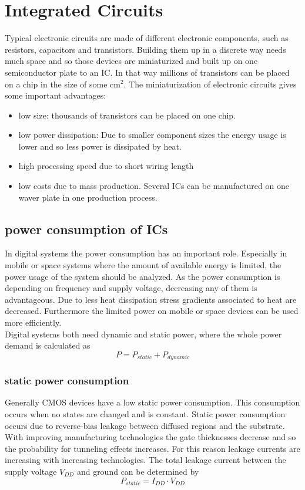 \chapter{Integrated Circuits}
Typical electronic circuits are made of different electronic components, such as resistors, capacitors and transistors. Building them up in a discrete way needs much space and so those devices are miniaturized and built up on one semiconductor plate to an IC. In that way millions of transistors can be placed on a chip in the size of some cm$^2$. The miniaturization of electronic circuits gives some important advantages:
\begin{itemize}
\item low size: thousands of transistors can be placed on one chip.
\item low power dissipation: Due to smaller component sizes the energy usage is lower and so less power is dissipated by heat.
\item high processing speed due to short wiring length
\item low costs due to mass production. Several ICs can be manufactured on one waver plate in one production process.
\end{itemize}
\section{power consumption of ICs}
In digital systems the power consumption has an important role. Especially in mobile or space systems where the amount of available energy is limited, the power usage of the system should be analyzed. As the power consumption is depending on frequency and supply voltage, decreasing any of them is advantageous. Due to less heat dissipation stress gradients associated to heat are decreased. Furthermore the limited power on mobile or space devices can be used more efficiently.\\
Digital systems both need dynamic and static power, where the whole power demand is calculated as
\begin{equation}
P=P_{static}+P_{dynamic}
\end{equation}
\subsection{static power consumption}
Generally CMOS devices have a low static power consumption. This consumption occurs when no states are changed and is constant. Static power consumption occurs due to reverse-bias leakage between diffused regions and the substrate.\cite{Sar97} With improving manufacturing technologies the gate thicknesses decrease and so the probability for tunneling effects increases. For this reason leakage currents are increasing with increasing technologies.\cite{Iye10} The total leakage current between the supply voltage $V_{DD}$ and ground can be determined by
\begin{equation}
P_{static}=I_{DD}\cdot V_{DD}
\end{equation}

